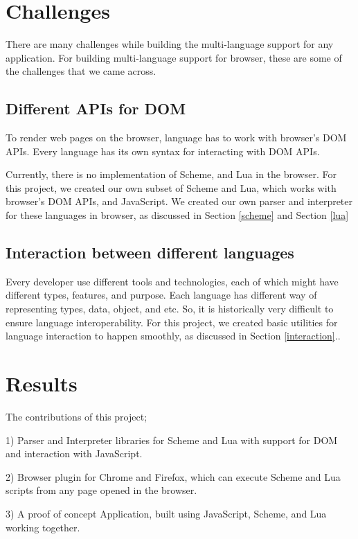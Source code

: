 \section{Challenges}

There are many challenges while building the multi-language support for any application. For building multi-language support for browser, these are some of the challenges that we came across.

\subsection{Different APIs for DOM}

To render web pages on the browser, language has to work with browser's DOM APIs. Every language has its own syntax for interacting with DOM APIs. 

Currently, there is no implementation of Scheme, and Lua in the browser. For this project, we created our own subset of Scheme and Lua, which works with browser's DOM APIs, and JavaScript.  We created our own parser and interpreter for these languages in browser, as discussed in Section \ref{scheme} and Section \ref{lua}

\subsection{Interaction between different languages}

Every developer use different tools and technologies, each of which might have different types, features, and purpose. Each language has different way of representing types, data, object, and etc. So, it is historically very difficult to ensure language interoperability. For this project, we created basic utilities for language interaction to happen smoothly, as discussed in Section \ref{interaction}..

\section{Results}

The contributions of this project;

1) Parser and Interpreter libraries for Scheme and Lua with support for DOM and interaction with JavaScript.

2) Browser plugin for Chrome and Firefox, which can execute Scheme and Lua scripts from any page opened in the browser.

3) A proof of concept Application, built using JavaScript, Scheme, and Lua working together.
